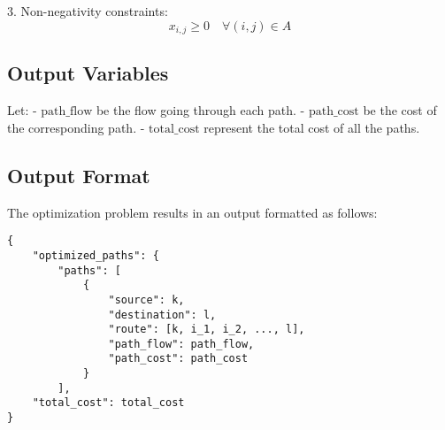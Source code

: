 \documentclass{article}
\begin{document}
3. Non-negativity constraints:
\[
x_{i,j} \geq 0 \quad \forall (i,j) \in A
\]

\subsection*{Output Variables}
Let:
- $\text{path\_flow}$ be the flow going through each path.
- $\text{path\_cost}$ be the cost of the corresponding path.
- $\text{total\_cost}$ represent the total cost of all the paths.

\subsection*{Output Format}
The optimization problem results in an output formatted as follows:
\begin{verbatim}
{
    "optimized_paths": {
        "paths": [
            {
                "source": k,
                "destination": l,
                "route": [k, i_1, i_2, ..., l],
                "path_flow": path_flow,
                "path_cost": path_cost
            }
        ],
    "total_cost": total_cost
}
\end{verbatim}
\end{document}
